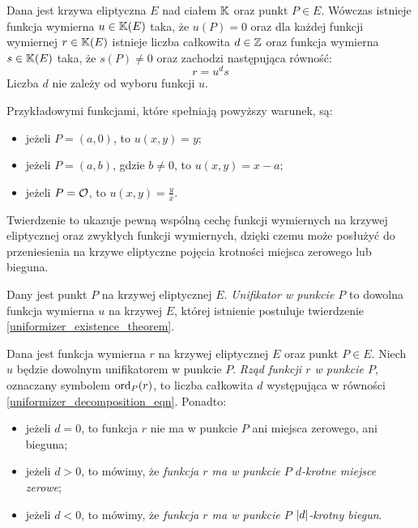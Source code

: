 \begin{theorem}\label{uniformizer_existence_theorem}
Dana jest krzywa eliptyczna $E$ nad ciałem $\mathbb{K}$
oraz punkt $P \in E$.
Wówczas istnieje funkcja wymierna $u \in \mathbb{K}(E)$ taka, że $u(P) = 0$
oraz dla każdej funkcji wymiernej $r \in \mathbb{K}(E)$
istnieje liczba całkowita $d \in \mathbb{Z}$
oraz funkcja wymierna $s \in \mathbb{K}(E)$ taka,
że $s(P) \neq 0$ oraz zachodzi następująca równość:
\begin{equation}\label{uniformizer_decomposition_eqn}
r = u^ds
\end{equation}
Liczba $d$ nie zależy od wyboru funkcji $u$.

\noindent
Przykładowymi funkcjami, które spełniają powyższy warunek, są:
\begin{itemize}
\item jeżeli $P = (a, 0)$, to $u(x, y) = y$;
\item jeżeli $P = (a, b)$, gdzie $b \neq 0$, to $u(x, y) = x - a$;
\item jeżeli $P = \mathcal{O}$, to $u(x, y) = \frac{y}{x}$.
\end{itemize}
\end{theorem}

\noindent
Twierdzenie to ukazuje pewną wspólną cechę
funkcji wymiernych na krzywej eliptycznej
oraz zwykłych funkcji wymiernych,
dzięki czemu może posłużyć do przeniesienia na krzywe eliptyczne
pojęcia krotności miejsca zerowego lub bieguna.

\begin{definition}
Dany jest punkt $P$ na krzywej eliptycznej $E$.
\emph{Unifikator w punkcie $P$}
to dowolna funkcja wymierna $u$ na krzywej $E$,
której istnienie postuluje twierdzenie \ref{uniformizer_existence_theorem}.
\end{definition}

\begin{definition}
Dana jest funkcja wymierna $r$ na krzywej eliptycznej $E$
oraz punkt $P \in E$.
Niech $u$ będzie dowolnym unifikatorem w punkcie $P$.
\emph{Rząd funkcji $r$ w punkcie $P$},
oznaczany symbolem $\operatorname{ord}_P(r)$,
to liczba całkowita $d$
występująca w równości \ref{uniformizer_decomposition_eqn}.
Ponadto:
\begin{itemize}
\item jeżeli $d = 0$,
to funkcja $r$ nie ma w punkcie $P$ ani miejsca zerowego, ani bieguna;
\item jeżeli $d > 0$, to mówimy,
że \emph{funkcja $r$ ma w punkcie $P$ $d$-krotne miejsce zerowe};
\item jeżeli $d < 0$, to mówimy,
że \emph{funkcja $r$ ma w punkcie $P$ $\lvert d\rvert$-krotny biegun}.
\end{itemize}
\end{definition}

